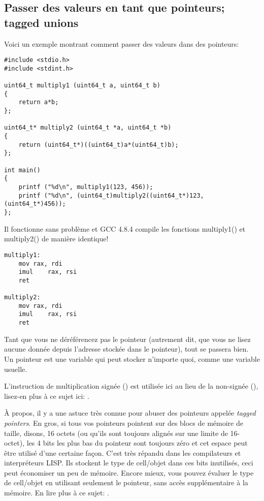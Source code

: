 \subsection{Passer des valeurs en tant que pointeurs; tagged unions}

Voici un exemple montrant comment passer des valeurs dans des pointeurs:

\begin{lstlisting}[label=unsigned_multiply_C,style=customc]
#include <stdio.h>
#include <stdint.h>

uint64_t multiply1 (uint64_t a, uint64_t b)
{
	return a*b;
};

uint64_t* multiply2 (uint64_t *a, uint64_t *b)
{
	return (uint64_t*)((uint64_t)a*(uint64_t)b);
};

int main()
{
	printf ("%d\n", multiply1(123, 456));
	printf ("%d\n", (uint64_t)multiply2((uint64_t*)123, (uint64_t*)456));
};
\end{lstlisting}

Il fonctionne sans problème et GCC 4.8.4 compile les fonctions multiply1() et multiply2()
de manière identique!

\begin{lstlisting}[label=unsigned_multiply_lst,style=customasmx86]
multiply1:
	mov	rax, rdi
	imul	rax, rsi
	ret

multiply2:
	mov	rax, rdi
	imul	rax, rsi
	ret
\end{lstlisting}

Tant que vous ne déréférencez pas le pointeur (autrement dit, que vous ne lisez aucune
donnée depuis l'adresse stockée dans le pointeur), tout se passera bien.
Un pointeur est une variable qui peut stocker n'importe quoi, comme une variable
usuelle.

L'instruction de multiplication signée (\IMUL) est utilisée ici au lieu de la non-signée
(\MUL), lisez-en plus à ce sujet ici:
.

À propos, il y a une astuce très connue pour abuser des pointeurs appelée \emph{tagged pointers}.
En gros, si tous vos pointeurs pointent sur des blocs de mémoire de taille, disons,
16 octets (ou qu'ils sont toujours alignés sur une limite de 16-octet), les 4 bits
les plus bas du pointeur sont toujours zéro et cet espace peut être utilisé d'une
certaine façon.
C'est très répandu dans les compilateurs et interpréteurs LISP.
Ils stockent le type de cell/objet dans ces bits inutilisés, ceci peut économiser
un peu de mémoire.
Encore mieux, vous pouvez évaluer le type de cell/objet en utilisant seulement le pointeur,
sans accès supplémentaire à la mémoire.
En lire plus à ce sujet: .

